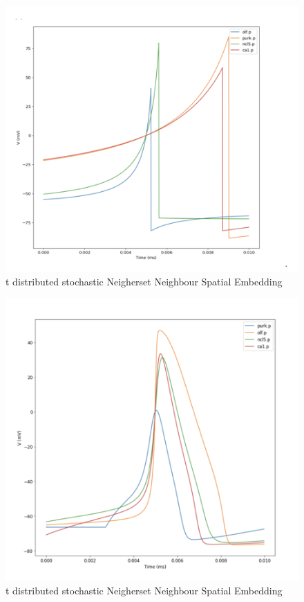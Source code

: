 \begin{figure}
	\includegraphics[width=\maxwidth{\textwidth}]{figures/results_izhi_waves.png}
	\caption{t distributed stochastic Neigherset Neighbour Spatial Embedding}
	\label{figure\arabic{figurecounter}}
\end{figure}
\begin{figure}
	\includegraphics[width=\maxwidth{\textwidth}]{figures/results_conductance_waves.png}
	\caption{t distributed stochastic Neigherset Neighbour Spatial Embedding}
	\label{figure\arabic{figurecounter}}
\end{figure}


